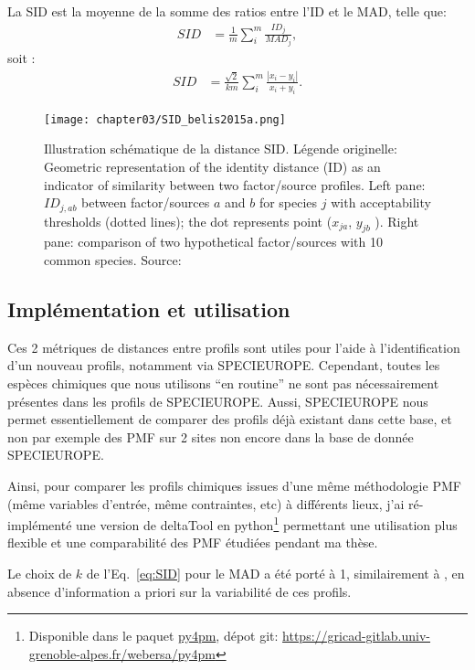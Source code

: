 La SID est la moyenne de la somme des ratios entre l'ID et le MAD, telle que:
\begin{align}
    \label{eq:SIDi}
    SID &= \frac{1}{m}\sum_i^m\frac{ID_j}{MAD_j},
\end{align}
soit :
\begin{align}
    \label{eq:SID}
    SID &= \frac{\sqrt{2}}{km} \sum_i^m \frac{|x_i - y_i|}{x_i + y_i}.
\end{align}

\begin{figure}[ht]
    \centering
    \texttt{[image: chapter03/SID\_belis2015a.png]}
    \caption{Illustration schématique de la distance SID. Légende originelle:
        Geometric representation of the identity distance (ID) as an indicator of
        similarity between two factor/source profiles. Left pane: $ID_{j,ab}$ between
        factor/sources $a$ and $b$ for species $j$ with acceptability thresholds (dotted lines);
        the dot represents point ($x_{ja}$, $y_{jb}$ ). Right pane: comparison of two
        hypothetical factor/sources with 10 common species.
        Source: \cite[figure 2]{belisNew2015}
}%
    \label{fig:chapter03/SID_belis2015a}
\end{figure}

\subsection{Implémentation et utilisation}%
\label{sub:implémentation_et_utilisation}

Ces 2 métriques de distances entre profils sont utiles pour l'aide à l'identification
d'un nouveau profils, notamment via SPECIEUROPE. Cependant, toutes les espèces chimiques
que nous utilisons ``en routine'' ne sont pas nécessairement présentes dans les profils de
SPECIEUROPE. Aussi, SPECIEUROPE nous permet essentiellement de comparer des profils déjà
existant dans cette base, et non
par exemple des PMF sur 2 sites non encore dans la base de donnée SPECIEUROPE.

Ainsi, pour comparer les profils chimiques issues d'une même méthodologie PMF (même
variables d'entrée, même contraintes, etc) à différents lieux, j'ai ré-implémenté une version
de deltaTool en python\footnote{Disponible dans le paquet
    \href{https://pypi.org/project/py4pm/}{py4pm}, dépot git:
\url{https://gricad-gitlab.univ-grenoble-alpes.fr/webersa/py4pm}
} permettant une
utilisation plus flexible et une comparabilité des PMF étudiées pendant ma thèse.

Le choix de $k$ de l'Eq.~\ref{eq:SID} pour le MAD a été porté à 1, similairement à
\cite{pernigottiDeltaSA2018}, en absence d'information a priori sur la variabilité de ces
profils.


